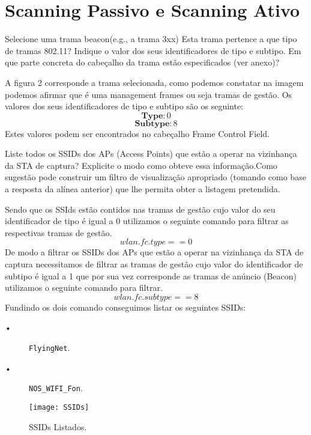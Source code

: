 \documentclass{exam}
\begin{document}
\section{Scanning Passivo e Scanning Ativo}

\begin{questions}
\question Selecione uma trama beacon(e.g., a trama 3xx) Esta trama pertence a que tipo de tramas 802.11? Indique o valor dos seus identificadores de tipo e subtipo.
Em que parte concreta do cabeçalho da trama estão especificados (ver anexo)?
\begin{solution}
A figura 2 corresponde a trama selecionada, como podemos constatar na imagem podemos afirmar que é uma management frames ou seja tramas de gestão.
Os valores dos seus identificadores de tipo e subtipo são os seguinte:
\begin{equation}
\textbf{Type}:0
\end{equation} 
\begin{equation}
\textbf{Subtype}:8
\end{equation} 
Estes valores podem ser encontrados no cabeçalho Frame Control Field.
\end{solution}

\question Liste todos os SSIDs dos APs (Access Points) que estão a operar na vizinhança da STA de captura? Explicite o modo como obteve essa informação.Como sugestão pode construir um filtro de visualização apropriado (tomando como base a resposta da alínea anterior) que lhe permita obter a listagem pretendida.
\begin{solution}
Sendo que os SSIds estão contidos nas tramas de gestão cujo  valor do seu identificador de tipo é igual a 0 utilizamos o seguinte comando para filtrar
as respectivas tramas de gestão.
\begin{equation}
wlan.fc.type==0
\end{equation}
De modo a filtrar os SSIDs dos APs que estão a operar na vizinhança da STA de captura necessitamos de filtrar as tramas de gestão cujo valor do identificador de subtipo é igual a 1 que por sua vez corresponde as tramas de anúncio (Beacon) utilizamos o seguinte comando para filtrar.
\begin{equation}
wlan.fc.subtype==8
\end{equation}
Fundindo os dois comando conseguimos listar os seguintes SSIDs:
\begin{description}
	\item[•] \verb|FlyingNet|. 
	\item[•] \verb|NOS_WIFI_Fon|.
\end{description}
\end{solution}
\begin{figure}[H]
\flushleft\texttt{[image: SSIDs]} 
\caption{\label{fig:controller}SSIDs Listados.}
\end{figure}




\end{questions}
\end{document}
